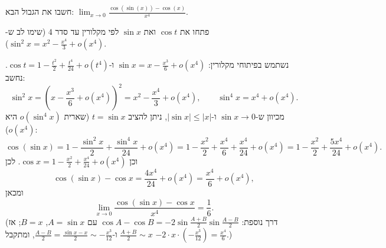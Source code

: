 
\begin{question}
חשבו את הגבול הבא: $\lim_{x\to0}\frac{\cos(\sin(x))-\cos(x)}{x^4}$.
\end{question}

\begin{hint}
פתחו את $\cos t$ ואת $\sin x$ לפי מקלורין עד סדר $4$ (שימו לב ש-$\sin^2x=x^2-\frac{x^4}{3}+o(x^4)$).
\end{hint}

\begin{solution}
נשתמש בפיתוחי מקלורין:
$\sin x=x-\frac{x^3}{6}+o(x^4)$ ו-$\cos t=1-\frac{t^2}{2}+\frac{t^4}{24}+o(t^4)$.
נחשב:
\[ \sin^2x=\left(x-\frac{x^3}{6}+o(x^4)\right)^2=x^2-\frac{x^4}{3}+o(x^4),\qquad \sin^4x=x^4+o(x^4). \]
מכיוון ש-$\sin x\to0$ ו-$|\sin x|\le|x|$, ניתן להציב $t=\sin x$ (שארית $o(\sin^4x)$ היא $o(x^4)$):
\[ \cos(\sin x)=1-\frac{\sin^2x}{2}+\frac{\sin^4x}{24}+o(x^4)=1-\frac{x^2}{2}+\frac{x^4}{6}+\frac{x^4}{24}+o(x^4)=1-\frac{x^2}{2}+\frac{5x^4}{24}+o(x^4). \]
וכן $\cos x=1-\frac{x^2}{2}+\frac{x^4}{24}+o(x^4)$. לכן
\[ \cos(\sin x)-\cos x=\frac{4x^4}{24}+o(x^4)=\frac{x^4}{6}+o(x^4), \]
ומכאן
\[ \lim_{x\to0}\frac{\cos(\sin x)-\cos x}{x^4}=\boxed{\frac16}. \]
(דרך נוספת: $\cos A-\cos B=-2\sin\frac{A+B}{2}\sin\frac{A-B}{2}$ עם $A=\sin x$, $B=x$; אז $\frac{A+B}{2}\sim x$ ו-$\frac{A-B}{2}=\frac{\sin x-x}{2}\sim-\frac{x^3}{12}$, ומתקבל $-2\cdot x\cdot(-\frac{x^3}{12})=\frac{x^4}{6}$.)
\end{solution}
